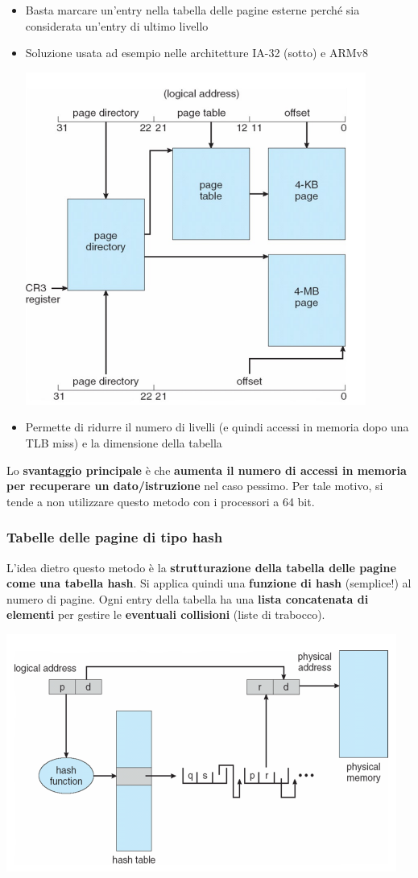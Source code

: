 \documentclass[12pt]{article}
\begin{document}
\begin{itemize}
    \item Basta marcare un'entry nella tabella delle pagine esterne perché sia considerata un'entry di ultimo livello
    \item Soluzione usata ad esempio nelle architetture IA-32 (sotto) e ARMv8
    \begin{center}
        \includegraphics[width = 0.70\linewidth]{Images/63.png}
    \end{center}
    \item Permette di ridurre il numero di livelli (e quindi accessi in memoria dopo una TLB miss) e la dimensione della tabella
\end{itemize}
Lo \textbf{svantaggio principale} è che \textbf{aumenta il numero di accessi in memoria per recuperare un dato/istruzione} nel caso pessimo.
Per tale motivo, si tende a non utilizzare questo metodo con i processori a 64 bit.
\subsubsection{Tabelle delle pagine di tipo hash}
L'idea dietro questo metodo è la \textbf{strutturazione della tabella delle pagine come una tabella hash}.
Si applica quindi una \textbf{funzione di hash} (semplice!) al numero di pagine.
Ogni entry della tabella ha una \textbf{lista concatenata di elementi} per gestire le \textbf{eventuali collisioni} (liste di trabocco). 
\begin{center}
    \includegraphics[width = 0.70\linewidth]{Images/64.png}
\end{center}
\end{document}
